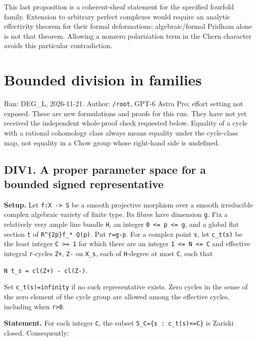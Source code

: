 \documentclass[11pt,a4paper]{article}
\theoremstyle{definition}
\begin{document}
This last proposition is a coherent-sheaf statement for the
specified fourfold family. Extension to arbitrary perfect complexes
would require an analytic effectivity theorem for their formal
deformations; algebraic/formal Pridham alone is not that theorem.
Allowing a nonzero polarization term in the Chern character
avoids this particular contradiction.

\section{Bounded division in families}

Run: DEG\_L, 2026-11-21. Author: \texttt{/root}, GPT-6 Astra Pro; effort
setting not exposed. These are new formulations and proofs for this run.
They have not yet received the independent whole-proof check requested
below. Equality of a cycle with a rational cohomology class always means
equality under the cycle-class map, not equality in a Chow group whose
right-hand side is undefined.

\subsection{DIV1. A proper parameter space for a bounded signed
representative}\label{div1.-a-proper-parameter-space-for-a-bounded-signed-representative}

\textbf{Setup.} Let \texttt{f:X\ -\textgreater{}\ S} be a smooth
projective morphism over a smooth irreducible complex algebraic variety
of finite type. Its fibres have dimension \texttt{g}. Fix a relatively
very ample line bundle \texttt{H}, an integer
\texttt{0\ \textless{}=\ p\ \textless{}=\ g}, and a global flat section
\texttt{t} of \texttt{R\^{}\{2p\}f\_*\ Q(p)}. Put \texttt{r=g-p}. For a
complex point \texttt{s}, let \texttt{c\_t(s)} be the least integer
\texttt{C\ \textgreater{}=\ 1} for which there are an integer
\texttt{1\ \textless{}=\ N\ \textless{}=\ C} and effective integral
\texttt{r}-cycles \texttt{Z+}, \texttt{Z-} on \texttt{X\_s}, each of
\texttt{H}-degree at most \texttt{C}, such that

\texttt{N\ t\_s\ =\ cl(Z+)\ -\ cl(Z-)}.

Set \texttt{c\_t(s)=infinity} if no such representative exists. Zero
cycles in the sense of the zero element of the cycle group are allowed
among the effective cycles, including when \texttt{r\textgreater{}0}.

\textbf{Statement.} For each integer \texttt{C}, the subset
\texttt{S\_C=\{s\ :\ c\_t(s)\textless{}=C\}} is Zariski closed.
Consequently:
\end{document}
